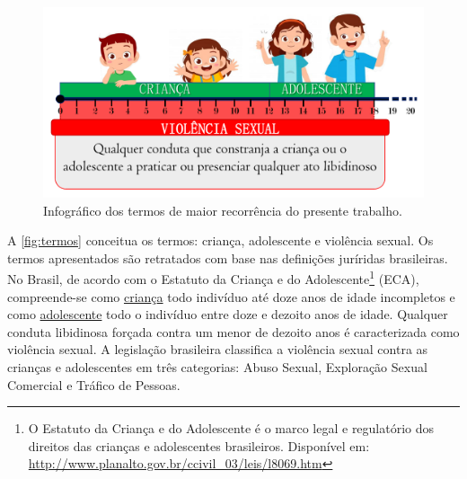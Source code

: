

\vspace{0.5cm}

\begin{figure}[htb]
	\caption{\label{fig:termos}Infográfico dos termos de maior recorrência do presente trabalho.}
	\begin{center}
	    \includegraphics[width=\textwidth]{./Figuras/ViolenciaS.pdf}
	\end{center}
\end{figure}

A \autoref{fig:termos} conceitua os termos: criança, adolescente e violência sexual. Os termos apresentados são retratados com base nas definições juríridas brasileiras. No Brasil, de acordo com o Estatuto da Criança e do Adolescente\footnote{O Estatuto da Criança e do Adolescente é o marco legal e regulatório dos direitos das crianças e adolescentes brasileiros. Disponível em: \url{http://www.planalto.gov.br/ccivil_03/leis/l8069.htm}} (ECA), compreende-se como \underline{crian}ç\underline{a} todo indivíduo até doze anos de idade incompletos e como \underline{adolescente} todo o indivíduo entre doze e dezoito anos de idade. Qualquer conduta libidinosa forçada contra um menor de dezoito anos é caracterizada como violência sexual. A legislação brasileira classifica a violência sexual contra as crianças e adolescentes em três categorias: Abuso Sexual, Exploração Sexual Comercial e Tráfico de Pessoas.








